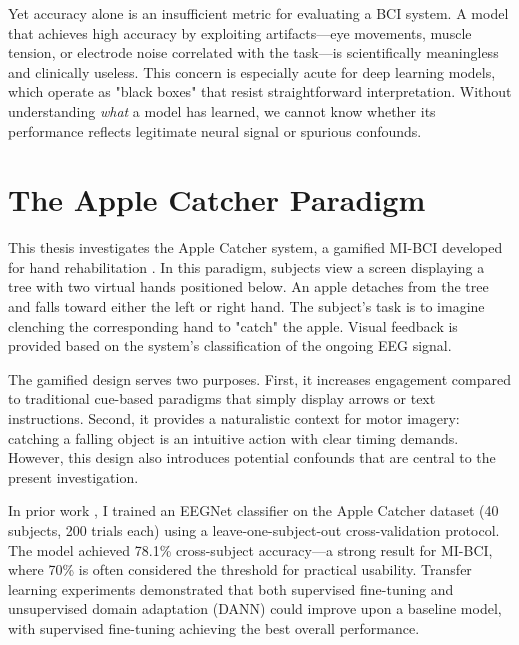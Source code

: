 Yet accuracy alone is an insufficient metric for evaluating a BCI system. A model that achieves high accuracy by exploiting artifacts—eye movements, muscle tension, or electrode noise correlated with the task—is scientifically meaningless and clinically useless. This concern is especially acute for deep learning models, which operate as "black boxes" that resist straightforward interpretation. Without understanding \textit{what} a model has learned, we cannot know whether its performance reflects legitimate neural signal or spurious confounds.


\section{The Apple Catcher Paradigm}
\label{sec:intro_apple_catcher}

This thesis investigates the Apple Catcher system, a gamified MI-BCI developed for hand rehabilitation \cite{skredsvig2025apple}. In this paradigm, subjects view a screen displaying a tree with two virtual hands positioned below. An apple detaches from the tree and falls toward either the left or right hand. The subject's task is to imagine clenching the corresponding hand to "catch" the apple. Visual feedback is provided based on the system's classification of the ongoing EEG signal.

The gamified design serves two purposes. First, it increases engagement compared to traditional cue-based paradigms that simply display arrows or text instructions. Second, it provides a naturalistic context for motor imagery: catching a falling object is an intuitive action with clear timing demands. However, this design also introduces potential confounds that are central to the present investigation.

In prior work \cite{fritzner2025specialization}, I trained an EEGNet classifier on the Apple Catcher dataset (40 subjects, 200 trials each) using a leave-one-subject-out cross-validation protocol. The model achieved 78.1\% cross-subject accuracy—a strong result for MI-BCI, where 70\% is often considered the threshold for practical usability. Transfer learning experiments demonstrated that both supervised fine-tuning and unsupervised domain adaptation (DANN) could improve upon a baseline model, with supervised fine-tuning achieving the best overall performance.

